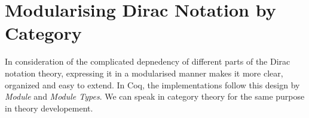 


\section{Modularising Dirac Notation by Category}
In consideration of the complicated depnedency of different parts of the Dirac notation theory, expressing it in a modularised manner makes it more clear, organized and easy to extend. In Coq, the implementations follow this design by \textit{Module} and \textit{Module Types}. We can speak in category theory for the same purpose in theory developement.


